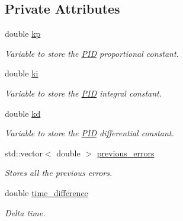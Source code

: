 \subsection*{Private Attributes}
\begin{DoxyCompactItemize}
\item 
\mbox{\label{classPID_a1d61c12e44fa9917dfc5c104493f5f29}} 
double \hyperlink{classPID_a1d61c12e44fa9917dfc5c104493f5f29}{kp}
\begin{DoxyCompactList}\small\item\em Variable to store the \hyperlink{classPID}{P\+ID} proportional constant. \end{DoxyCompactList}\item 
\mbox{\label{classPID_a750722249a34a914f6e2f05cd9d4dee3}} 
double \hyperlink{classPID_a750722249a34a914f6e2f05cd9d4dee3}{ki}
\begin{DoxyCompactList}\small\item\em Variable to store the \hyperlink{classPID}{P\+ID} integral constant. \end{DoxyCompactList}\item 
\mbox{\label{classPID_a0094a774f6f64b4a1a9f93fd877c5df4}} 
double \hyperlink{classPID_a0094a774f6f64b4a1a9f93fd877c5df4}{kd}
\begin{DoxyCompactList}\small\item\em Variable to store the \hyperlink{classPID}{P\+ID} differential constant. \end{DoxyCompactList}\item 
\mbox{\label{classPID_ac837139ae6aaf6c061124baa8b76f024}} 
std\+::vector$<$ double $>$ \hyperlink{classPID_ac837139ae6aaf6c061124baa8b76f024}{previous\+\_\+errors}
\begin{DoxyCompactList}\small\item\em Stores all the previous errors. \end{DoxyCompactList}\item 
\mbox{\label{classPID_a4602f44f11a5d2a7c9717bae29b27470}} 
double \hyperlink{classPID_a4602f44f11a5d2a7c9717bae29b27470}{time\+\_\+difference}
\begin{DoxyCompactList}\small\item\em Delta time. \end{DoxyCompactList}\item 

\end{DoxyCompactItemize}
